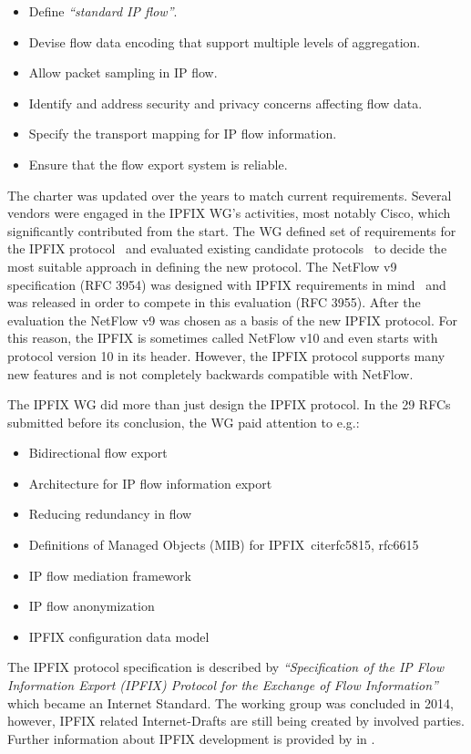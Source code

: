 \begin{itemize}
	\item Define \emph{``standard IP flow''}.
	\item Devise flow data encoding that support multiple levels of aggregation.
	\item Allow packet sampling in IP flow.
	\item Identify and address security and privacy concerns affecting flow data.
	\item Specify the transport mapping for IP flow information.
	\item Ensure that the flow export system is reliable.
\end{itemize}

The charter was updated over the years to match current requirements. Several vendors were engaged in the IPFIX WG’s activities, most notably Cisco, which significantly contributed from the start. The WG defined set of requirements for the IPFIX protocol~\cite{rfc3917} and evaluated existing candidate protocols~\cite{rfc3955} to decide the most suitable approach in defining the new protocol. The NetFlow v9 specification (RFC 3954) was designed with IPFIX requirements in mind~\cite{Trammell-2011-Introduction} and was released in order to compete in this evaluation (RFC 3955). After the evaluation the NetFlow v9 was chosen as a basis of the new IPFIX protocol. For this reason, the IPFIX is sometimes called NetFlow v10 and even starts with protocol version 10 in its header. However, the IPFIX protocol supports many new features and is not completely backwards compatible with NetFlow.

The IPFIX WG did more than just design the IPFIX protocol. In the 29 RFCs submitted before its conclusion, the WG paid attention to e.g.:
\begin{itemize}
	\item Bidirectional flow export~\cite{rfc5103}
	\item Architecture for IP flow information export~\cite{rfc5470}
	\item Reducing redundancy in flow~\cite{rfc5473}
	\item Definitions of Managed Objects (MIB) for IPFIX~cite{rfc5815, rfc6615}
	\item IP flow mediation framework~\cite{rfc5982, rfc6183}
	\item IP flow anonymization~\cite{rfc6235}
	\item IPFIX configuration data model~\cite{rfc6728}
\end{itemize}
The IPFIX protocol specification is described by \emph{``Specification of the IP Flow Information Export (IPFIX) Protocol for the Exchange of Flow Information''}~\cite{rfc7011} which became an Internet Standard. The working group was concluded in 2014, however, IPFIX related Internet-Drafts are still being created by involved parties. Further information about IPFIX development is provided by \citeauthor{Brownlee-2011-Flow} in \cite{Brownlee-2011-Flow}.

